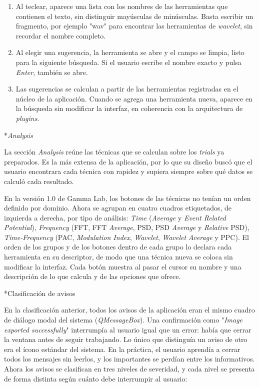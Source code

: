 \documentclass[12pt,letterpaper,oneside]{article}
\makeatletter
\newcommand{\subsubsubsection}[1]{%
  \@startsection{paragraph}{4}{\z@}{10pt plus 2pt minus 1pt}{4pt}%
    {\normalfont\normalsize\bfseries\itshape}*{#1}}
\makeatother
\begin{document}
\begin{enumerate}
    \item Al teclear, aparece una lista con los nombres de las herramientas que contienen el texto, sin distinguir mayúsculas de minúsculas. Basta escribir un fragmento, por ejemplo "wav" para encontrar las herramientas de \textit{wavelet}, sin recordar el nombre completo.

    \item Al elegir una sugerencia, la herramienta se abre y el campo se limpia, listo para la siguiente búsqueda. Si el usuario escribe el nombre exacto y pulsa \textit{Enter}, también se abre.

    \item Las sugerencias se calculan a partir de las herramientas registradas en el núcleo de la aplicación. Cuando se agrega una herramienta nueva, aparece en la búsqueda sin modificar la interfaz, en coherencia con la arquitectura de \textit{plugins}.
\end{enumerate}

\subsubsubsection{\textit{Analysis}}

La sección \textit{Analysis} reúne las técnicas que se calculan sobre los \textit{trials} ya preparados. Es la más extensa de la aplicación, por lo que su diseño buscó que el usuario encontrara cada técnica con rapidez y supiera siempre sobre qué datos se calculó cada resultado.

En la versión 1.0 de Gamma Lab, los botones de las técnicas no tenían un orden definido por dominio. Ahora se agrupan en cuatro cuadros etiquetados, de izquierda a derecha, por tipo de análisis: \textit{Time} (\textit{Average} y \textit{Event Related Potential}), \textit{Frequency} (FFT, FFT \textit{Average}, PSD, PSD \textit{Average} y \textit{Relative} PSD), \textit{Time-Frequency} (PAC, \textit{Modulation Index}, \textit{Wavelet}, \textit{Wavelet} \textit{Average} y PPC). El orden de los grupos y de los botones dentro de cada grupo lo declara cada herramienta en su descriptor, de modo que una técnica nueva se coloca sin modificar la interfaz. Cada botón muestra al pasar el cursor su nombre y una descripción de lo que calcula y de las opciones que ofrece.

\subsubsubsection{Clasificación de avisos}

En la clasificación anterior, todos los avisos de la aplicación eran el mismo cuadro de diálogo modal del sistema (\textit{QMessageBox}). Una confirmación como "\textit{Image exported successfully}" interrumpía al usuario igual que un error: había que cerrar la ventana antes de seguir trabajando. Lo único que distinguía un aviso de otro era el ícono estándar del sistema. En la práctica, el usuario aprendía a cerrar todos los mensajes sin leerlos, y los importantes se perdían entre los informativos. Ahora los avisos se clasifican en tres niveles de severidad, y cada nivel se presenta de forma distinta según cuánto debe interrumpir al usuario:
\end{document}
